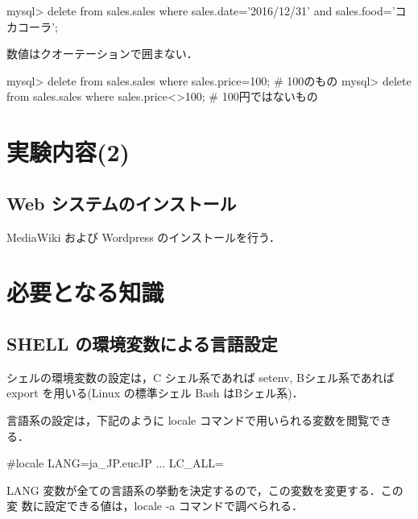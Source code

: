 \begin{cli}
mysql> delete from sales.sales where sales.date='2016/12/31' and
 sales.food='コカコーラ';
\end{cli}

数値はクオーテーションで囲まない．

\begin{cli}
mysql> delete from sales.sales where sales.price=100;
# 100のもの
mysql> delete from sales.sales where sales.price<>100;
# 100円ではないもの
\end{cli}






\clearpage
\section{実験内容(2)}

\subsection*{Web システムのインストール}

%
MediaWiki および Wordpress のインストールを行う．


\section{必要となる知識}

\subsection{SHELL の環境変数による言語設定}

シェルの環境変数の設定は，C シェル系であれば setenv, Bシェル系であれば
export を用いる(Linux の標準シェル Bash はBシェル系)．

言語系の設定は，下記のように locale コマンドで用いられる変数を閲覧できる．

\begin{cli}
#locale
LANG=ja_JP.eucJP
  ...
LC_ALL=
\end{cli}

LANG 変数が全ての言語系の挙動を決定するので，この変数を変更する．この変
数に設定できる値は，locale -a コマンドで調べられる．

